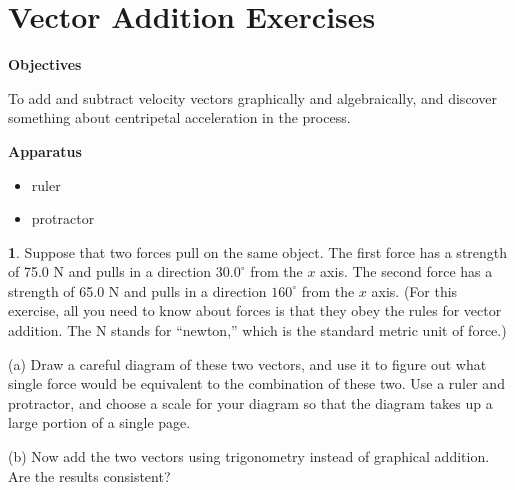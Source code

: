 
\section{Vector Addition Exercises}

\makelabheader %

\bigskip

\textbf{Objectives}

To add and subtract velocity vectors graphically and algebraically, and discover something about centripetal acceleration in the process.

\bigskip

\textbf{Apparatus}
\begin{itemize} \itemsep1pt
\item ruler
\item protractor 
\end{itemize}

\bigskip

{\bf 1}.
Suppose that two forces pull on the same object.  The first force has
a strength of 75.0 N and pulls in a direction $30.0^\circ$ from the $x$
axis.  The second force has a strength of 65.0 N and pulls in a direction 
$160^\circ$ from the $x$ axis.  (For this exercise, all you need
to know about forces is that they obey the rules for vector addition.
The N stands for ``newton,'' which is the standard metric unit of force.)

(a) Draw a careful diagram of these two vectors, and use it to figure out
what single force would be equivalent to the combination of these two.
Use a ruler and protractor, and choose a scale for your diagram so that
the diagram takes up a large portion of a single page.

(b) Now add the two vectors using 
trigonometry instead
of graphical addition.  Are the results consistent?

\vfil\vfil


